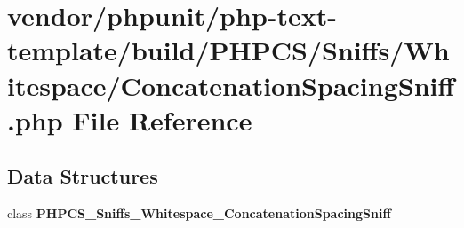 \section{vendor/phpunit/php-\/text-\/template/build/\+P\+H\+P\+C\+S/\+Sniffs/\+Whitespace/\+Concatenation\+Spacing\+Sniff.php File Reference}
\label{php-text-template_2build_2_p_h_p_c_s_2_sniffs_2_whitespace_2_concatenation_spacing_sniff_8php}
\subsection*{Data Structures}
\begin{DoxyCompactItemize}
\item 
class {\bf P\+H\+P\+C\+S\+\_\+\+Sniffs\+\_\+\+Whitespace\+\_\+\+Concatenation\+Spacing\+Sniff}
\end{DoxyCompactItemize}
